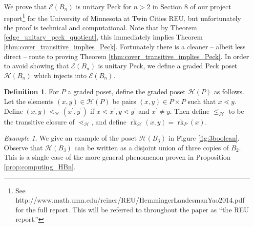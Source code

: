 \documentclass[smallextended, envcountsame, numbook]{svjour3}
\theoremstyle{plain}
\theoremstyle{definition}
\newtheorem{defn}[thm]{Definition}
\theoremstyle{remark}
\newtheorem{eg}[thm]{Example}
\numberwithin{equation}{section}
\newcommand\rk{\operatorname{rk}}
\begin{document}
We prove that $\mathcal E(B_n)$ is unitary Peck for $n > 2$ in Section 8 of our project report\footnote{See http://www.math.umn.edu/reiner/REU/HemmingerLandesmanYao2014.pdf for the full report. This will be referred to throughout the paper as ``the REU report.''} for the University of Minnesota at Twin Cities REU, but unfortunately the proof is technical and computational. Note that by Theorem \ref{edge_unitary_peck_quotient}, this immediately implies Theorem \ref{thm:cover_transitive_implies_Peck}. Fortunately there is a cleaner -- albeit less direct -- route to proving Theorem \ref{thm:cover_transitive_implies_Peck}. In order to avoid showing that $\mathcal E(B_n)$ is unitary Peck, we define a graded Peck poset $\mathcal{H}(B_n)$ which injects into $\mathcal E(B_n)$. 
\begin{defn}
\label{defn:h_map}
For $P$ a graded poset, define the graded poset $\mathcal H(P)$ as follows.  Let the elements $(x, y) \in \mathcal H(P)$ be pairs $(x,y) \in P\times P$ such that $x \lessdot y$.  Define $(x, y) \lessdot_{\mathcal H} (x^\prime, y^\prime)$ if $x \lessdot x^\prime,y\lessdot y^\prime$ and $x^\prime \neq y$.  Then define $\leq_{\mathcal H}$ to be the transitive closure of $\lessdot_{\mathcal H}$, and define $\rk_{\mathcal H}(x, y) = \rk_P(x)$.
\end{defn}


\begin{eg}
\label{eg:3boolean}
We give an example of the poset $\mathcal H(B_3)$ in Figure \ref{fig:3boolean}. Observe that $\mathcal H(B_3)$ can be written as a disjoint union of three copies of $B_2$. This is a single case of the more general phenomenon proven in Proposition \ref{prop:computing_HBn}.
\end{eg}
\end{document}
